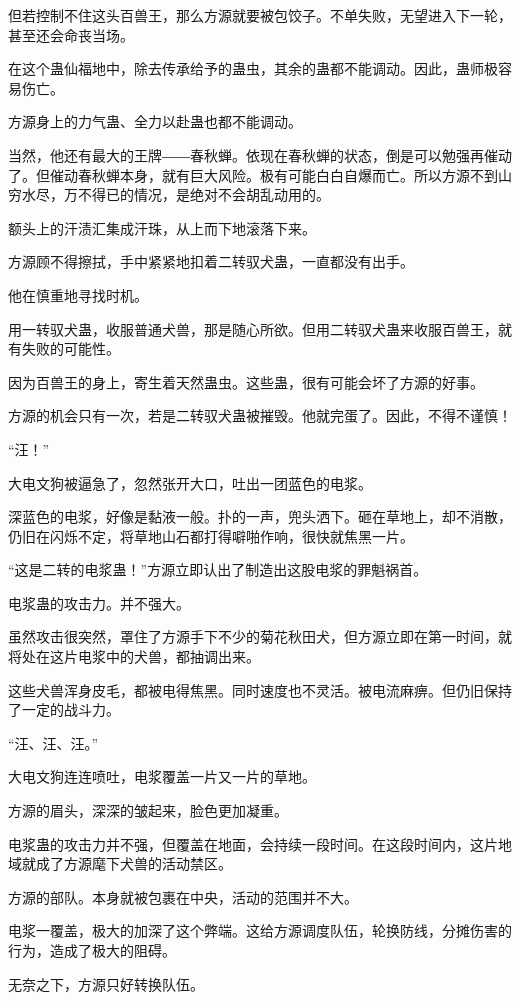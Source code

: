 \begin{this_body}
但若控制不住这头百兽王，那么方源就要被包饺子。不单失败，无望进入下一轮，甚至还会命丧当场。

在这个蛊仙福地中，除去传承给予的蛊虫，其余的蛊都不能调动。因此，蛊师极容易伤亡。

方源身上的力气蛊、全力以赴蛊也都不能调动。

当然，他还有最大的王牌――春秋蝉。依现在春秋蝉的状态，倒是可以勉强再催动了。但催动春秋蝉本身，就有巨大风险。极有可能白白自爆而亡。所以方源不到山穷水尽，万不得已的情况，是绝对不会胡乱动用的。

额头上的汗渍汇集成汗珠，从上而下地滚落下来。

方源顾不得擦拭，手中紧紧地扣着二转驭犬蛊，一直都没有出手。

他在慎重地寻找时机。

用一转驭犬蛊，收服普通犬兽，那是随心所欲。但用二转驭犬蛊来收服百兽王，就有失败的可能性。

因为百兽王的身上，寄生着天然蛊虫。这些蛊，很有可能会坏了方源的好事。

方源的机会只有一次，若是二转驭犬蛊被摧毁。他就完蛋了。因此，不得不谨慎！

“汪！”

大电文狗被逼急了，忽然张开大口，吐出一团蓝色的电浆。

深蓝色的电浆，好像是黏液一般。扑的一声，兜头洒下。砸在草地上，却不消散，仍旧在闪烁不定，将草地山石都打得噼啪作响，很快就焦黑一片。

“这是二转的电浆蛊！”方源立即认出了制造出这股电浆的罪魁祸首。

电浆蛊的攻击力。并不强大。

虽然攻击很突然，罩住了方源手下不少的菊花秋田犬，但方源立即在第一时间，就将处在这片电浆中的犬兽，都抽调出来。

这些犬兽浑身皮毛，都被电得焦黑。同时速度也不灵活。被电流麻痹。但仍旧保持了一定的战斗力。

“汪、汪、汪。”

大电文狗连连喷吐，电浆覆盖一片又一片的草地。

方源的眉头，深深的皱起来，脸色更加凝重。

电浆蛊的攻击力并不强，但覆盖在地面，会持续一段时间。在这段时间内，这片地域就成了方源麾下犬兽的活动禁区。

方源的部队。本身就被包裹在中央，活动的范围并不大。

电浆一覆盖，极大的加深了这个弊端。这给方源调度队伍，轮换防线，分摊伤害的行为，造成了极大的阻碍。

无奈之下，方源只好转换队伍。


\end{this_body}
